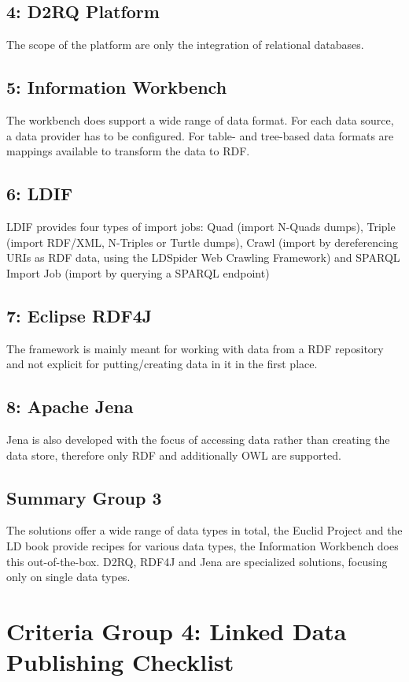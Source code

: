 \subsection*{4: D2RQ Platform}
The scope of the platform are only the integration of relational databases.

\subsection*{5: Information Workbench}
The workbench does support a wide range of data format. For each data source, a 
data provider has to be configured. For table- and tree-based data formats are 
mappings available to transform the data to RDF.

\subsection*{6: LDIF}
LDIF provides four types of import jobs: Quad (import N-Quads dumps), Triple 
(import RDF/XML, N-Triples or Turtle dumps), Crawl (import by dereferencing URIs 
as RDF data, using the LDSpider Web Crawling Framework) and SPARQL Import Job 
(import by querying a SPARQL endpoint)

\subsection*{7: Eclipse RDF4J}
The framework is mainly meant for working with data from a RDF repository and not 
explicit for putting/creating data in it in the first place. 

\subsection*{8: Apache Jena}
Jena is also developed with the focus of accessing data rather than creating the 
data store, therefore only RDF and additionally OWL are supported.

\subsection{Summary Group 3}
The solutions offer a wide range of data types in total, the Euclid Project and 
the LD book provide recipes for various data types, the Information Workbench does 
this out-of-the-box. D2RQ, RDF4J and Jena are specialized solutions, focusing only 
on single data types.

\section{Criteria Group 4: Linked Data Publishing Checklist}

